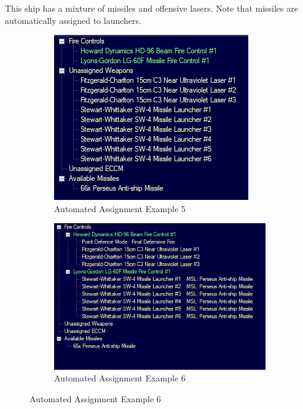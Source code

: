 \documentclass[../../Aurora C# unofficial manual.tex]{subfiles}
\begin{document}
	This ship has a mixture of missiles and offensive lasers. Note that missiles are automatically assigned to launchers.
	\begin{figure}[H]
		\centering
		\begin{subfigure}{.5\textwidth}
			\centering
			\includegraphics[width=0.5\linewidth]{images/AutomatedAssignment5}
			\caption[Automated Assignment]{Automated Assignment Example 5}
			\label{fig:automatedassignment5}
		\end{subfigure}%
		\begin{subfigure}{.5\textwidth}
			\centering
			\includegraphics[width=0.5\linewidth]{images/AutomatedAssignment6}
			\caption[Automated Assignment]{Automated Assignment Example 6}
			\label{fig:automatedassignment6}
		\end{subfigure}
	\end{figure}
	
\end{document}
